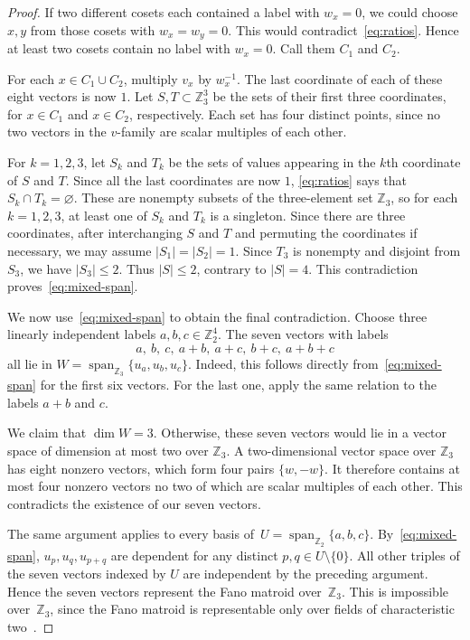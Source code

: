 \documentclass[10pt,a4paper]{amsart}
\theoremstyle{plain}
\numberwithin{equation}{section}
\theoremstyle{remark}
\theoremstyle{definition}
\newcommand{\Z}{\mathbb Z}
\newcommand{\spn}[2]{\operatorname{span}_{\Z_#1}\{#2\}}
\begin{document}
\begin{proof}
If two different cosets each contained a label with $w_x=0$, we could choose $x,y$ from those cosets with $w_x=w_y=0$.
This would contradict~\eqref{eq:ratios}.
Hence at least two cosets contain no label with $w_x=0$.
Call them $C_1$ and $C_2$.

For each $x\in C_1\cup C_2$, multiply $v_x$ by $w_x^{-1}$.
The last coordinate of each of these eight vectors is now $1$.
Let $S,T\subset\Z_3^3$ be the sets of their first three coordinates, for $x\in C_1$ and $x\in C_2$, respectively.
Each set has four distinct points, since no two vectors in the $v$-family are scalar multiples of each other.

For $k=1,2,3$, let $S_k$ and $T_k$ be the sets of values appearing in the $k$th coordinate of $S$ and $T$.
Since all the last coordinates are now $1$, \eqref{eq:ratios} says that $S_k\cap T_k=\varnothing$.
These are nonempty subsets of the three-element set $\Z_3$, so for each $k=1,2,3$, at least one of $S_k$ and $T_k$ is a singleton.
Since there are three coordinates, after interchanging $S$ and $T$ and permuting the coordinates if necessary, we may assume $|S_1| = |S_2| = 1$.
Since $T_3$ is nonempty and disjoint from $S_3$, we have $|S_3| \leq 2$.
Thus $|S| \leq 2$, contrary to $|S| = 4$.
This contradiction proves~\eqref{eq:mixed-span}.

We now use~\eqref{eq:mixed-span} to obtain the final contradiction.
Choose three linearly independent labels $a,b,c\in\Z_2^4$.
The seven vectors with labels
$$
    a,\ b,\ c,\ a+b,\ a+c,\ b+c,\ a+b+c
$$
all lie in $ W=\spn{3}{u_a,u_b,u_c}$.
Indeed, this follows directly from~\eqref{eq:mixed-span} for the first six vectors.
For the last one, apply the same relation to the labels $a+b$ and $c$.

We claim that $\dim W=3$.
Otherwise, these seven vectors would lie in a vector space of dimension at most two over $\Z_3$.
A two-dimensional vector space over $\Z_3$ has eight nonzero vectors, which form four pairs $\{w,-w\}$.
It therefore contains at most four nonzero vectors no two of which are scalar multiples of each other.
This contradicts the existence of our seven vectors.

The same argument applies to every basis of~$U=\spn{2}{a,b,c}$.
By~\eqref{eq:mixed-span}, $u_p,u_q,u_{p+q}$ are dependent for any distinct $p, q \in U \setminus \{0\}$.
All other triples of the seven vectors indexed by $U$ are independent by the preceding argument.
Hence the seven vectors represent the Fano matroid over~$\Z_3$.
This is impossible over~$\Z_3$, since the Fano matroid is representable only over fields of characteristic two~\cite[Proposition~6.4.8(i)]{Oxley2011book}.
\end{proof}
\end{document}
